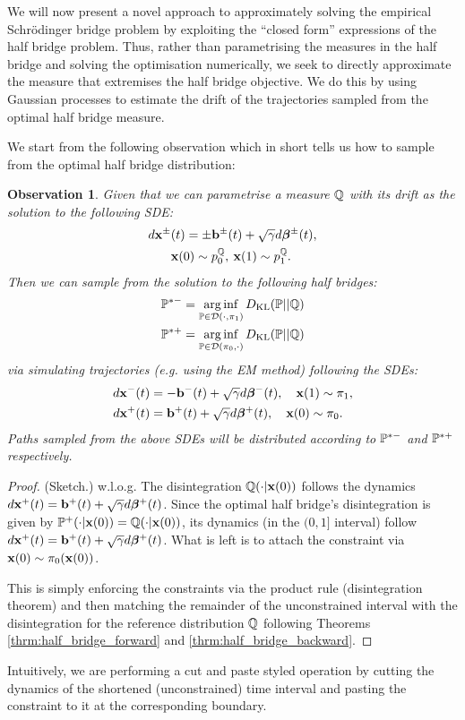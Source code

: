 \documentclass[a4paper,12pt,twoside,openright]{report}
\newtheorem{observation}{Observation}
\theoremstyle{definition}
\begin{document}
We will now present a novel approach to approximately solving the empirical Schrödinger bridge problem by exploiting the ``closed form'' expressions of the half bridge problem.  Thus, rather than parametrising the measures in the half bridge and solving the optimisation numerically, we seek to directly approximate the measure that extremises the half bridge objective. We do this by using Gaussian processes \citep{williams2006gaussian} to estimate the drift of the trajectories sampled from the optimal half bridge measure.

We start from the following observation which in short tells us how to sample from the optimal half bridge distribution:
\begin{observation}
Given that we can parametrise a measure $\Q$ with its drift as the solution to the following SDE:
\begin{align*}
    d\rvx^{\pm}&(t) =  \pm \rvb^{\pm}(t) + \sqrt{\gamma} d \rvw^{\pm}(t) ,\\
 &\rvx(0) \sim p_0^\Q,\:\rvx(1) \sim p_1^\Q.
\end{align*}
Then we can sample from the solution to the following half bridges:
\begin{align*}
   \P^{*-} = \arginf_{\P \in \calD(\cdot,\pi_1)}\KL(\P || \Q) \\ 
   \P^{*+} = \arginf_{\P \in \calD(\pi_0,\cdot )}\KL(\P || \Q)
\end{align*}
via simulating trajectories (e.g. using the EM method) following the SDEs:
\begin{align*}
     d\rvx^{-}(t) &=  - \rvb^{-}(t) + \sqrt{\gamma} d \rvw^{-}(t) , \quad  \rvx(1) \sim \pi_1, \\
     d\rvx^{+}(t) &=  \rvb^{+}(t) + \sqrt{\gamma} d \rvw^{+}(t) , \quad  \rvx(0) \sim \pi_0.
\end{align*}
Paths sampled from the above SDEs will be distributed according to $\P^{*-}$ and $\P^{*+}$ respectively.
\end{observation}
\begin{proof}(Sketch.)
w.l.o.g. The disintegration $\Q( \cdot| \rvx(0) )$ follows the dynamics $d\rvx^{+}(t) =  \rvb^{+}(t) + \sqrt{\gamma} d \rvw^{+}(t)$. Since the optimal half bridge's disintegration is given by $\P^+( \cdot| \rvx(0) ) =\Q( \cdot| \rvx(0) )$, its dynamics (in the $(0,1]$ interval) follow  $d\rvx^{+}(t) =  \rvb^{+}(t) + \sqrt{\gamma} d \rvw^{+}(t)$. What is left is to attach the constraint via $\rvx(0) \sim \pi_0(\rvx(0))$. 

This is simply enforcing the constraints via the product rule (disintegration theorem) and then matching the remainder of the unconstrained interval with the disintegration for the reference distribution $\Q$ following Theorems \ref{thrm:half_bridge_forward} and \ref{thrm:half_bridge_backward}.
\end{proof}
Intuitively, we are performing a cut and paste styled operation by cutting  the dynamics of the shortened (unconstrained) time interval and pasting the constraint to it at the corresponding boundary.
\end{document}

